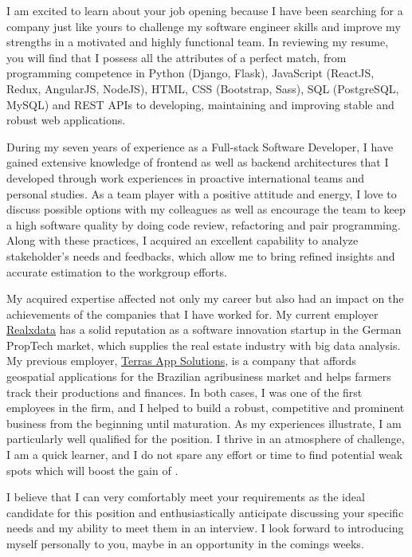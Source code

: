 I am excited to learn about your job opening because I have been searching for a
company just like yours to challenge my software engineer skills and improve my
strengths in a motivated and highly functional team. In reviewing my resume, you will find
that I possess all the attributes of a perfect match, from programming competence in
Python (Django, Flask), JavaScript (ReactJS, Redux, AngularJS,
NodeJS), HTML, CSS (Bootstrap, Sass), SQL (PostgreSQL, MySQL) and REST APIs to
developing, maintaining and improving stable and robust web applications.

During my seven years of experience as a Full-stack Software Developer, I have
gained extensive knowledge of frontend as well as backend architectures that
I developed through work experiences in proactive international teams and personal
studies. As a team player with a positive attitude and energy, I love to discuss
possible options with my colleagues as well as encourage the team to keep a high
software quality by doing code review, refactoring and pair programming. Along
with these practices, I acquired an excellent capability to analyze stakeholder's
needs and feedbacks, which allow me to bring refined insights and accurate estimation
to the workgroup efforts.

My acquired expertise affected not only my career but also had an impact on the
achievements of the companies that I have worked for. My current employer
\href{https://www.realxdata.com/}{Realxdata} has a solid reputation as a software
innovation startup in the German PropTech market, which supplies the real estate
industry with big data analysis. My previous employer, \href{http://terras.agr.br/}{Terras App Solutions},
is a company that affords geospatial applications for the Brazilian agribusiness
market and helps farmers track their productions and finances. In both cases,
I was one of the first employees in the firm, and I helped to build a robust,
competitive and prominent business from the beginning until maturation. As my
experiences illustrate, I am particularly well qualified for the position.
I thrive in an atmosphere of challenge, I am a quick learner, and I do not spare
any effort or time to find potential weak spots which will boost the gain of \companyName.

I believe that I can very comfortably meet your requirements as the ideal candidate
for this position and enthusiastically anticipate discussing your specific needs
and my ability to meet them in an interview. I look forward to introducing myself
personally to you, maybe in an opportunity in the comings weeks.
